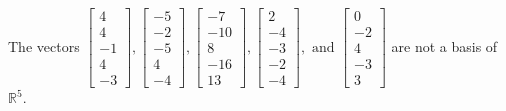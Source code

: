 \begin{exercise}
\begin{exerciseStatement}
  \end{exerciseStatement}
  \begin{exerciseAnswer}
   The vectors \(\left[\begin{array}{r}
4 \\
4 \\
-1 \\
4 \\
-3
\end{array}\right] , \left[\begin{array}{r}
-5 \\
-2 \\
-5 \\
4 \\
-4
\end{array}\right] , \left[\begin{array}{r}
-7 \\
-10 \\
8 \\
-16 \\
13
\end{array}\right] , \left[\begin{array}{r}
2 \\
-4 \\
-3 \\
-2 \\
-4
\end{array}\right] , \text{ and } \left[\begin{array}{r}
0 \\
-2 \\
4 \\
-3 \\
3
\end{array}\right]\) 
  	 are not  a basis of \(\mathbb{R}^5\).
  


  \end{exerciseAnswer}
\end{exercise}